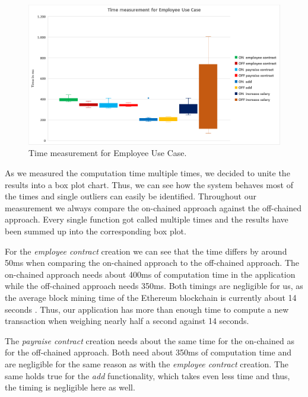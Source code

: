 \begin{figure}[t]%
\centering
\includegraphics[width=1.0\textwidth]{images/05_evaluation/05_time.png}
\caption{\label{fig:05_time}Time measurement for Employee Use Case.}
\end{figure}

As we measured the computation time multiple times, we decided to unite the results into a box plot chart.
Thus, we can see how the system behaves most of the times and single outliers can easily be identified.
Throughout our measurement we always compare the on-chained approach against the off-chained approach.
Every single function got called multiple times and the results have been summed up into the corresponding box plot.

For the \textit{employee contract} creation we can see that the time differs by around 50ms when comparing the on-chained approach to the off-chained approach.
The on-chained approach needs about 400ms of computation time in the application while the off-chained approach needs 350ms.
Both timings are negligible for us, as the average block mining time of the Ethereum blockchain is currently about 14 seconds \cite{etherscan_blocktime}.
Thus, our application has more than enough time to compute a new transaction when weighing nearly half a second against 14 seconds.

The \textit{payraise contract} creation needs about the same time for the on-chained as for the off-chained approach.
Both need about 350ms of computation time and are negligible for the same reason as with the \textit{employee contract} creation.
The same holds true for the \textit{add} functionality, which takes even less time and thus, the timing is negligible here as well.

